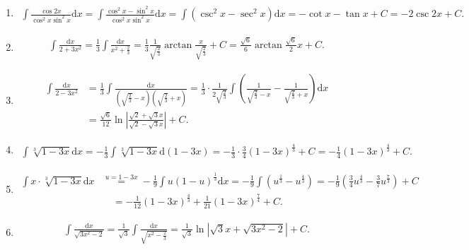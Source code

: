 \begin{solution}
\begin{enumerate}
    \item[8.]
    \[
    \begin{aligned}
    \int\frac{\cos{2x}}{\cos^2{x}\sin^2{x}}\mathrm{d}x=\int\frac{\cos^2{x}-\sin^2{x}}{\cos^2{x}\sin^2{x}}\mathrm{d}x=\int\left(\csc^2{x}-\sec^2{x}\right)\mathrm{d}x=-\cot{x}-\tan{x}+C=-2\csc{2x}+C.
    \end{aligned}
    \]

    \item[9.]
    \[
    \begin{aligned}
    \int\frac{\mathrm{d}x}{2+3x^2}=\frac{1}{3}\int\frac{\mathrm{d}x}{x^2+\frac{2}{3}}=\frac{1}{3}\frac{1}{\sqrt{\frac{2}{3}}}\arctan{\frac{x}{\sqrt{\frac{2}{3}}}}+C=\frac{\sqrt{6}}{6}\arctan{\frac{\sqrt{6}}{2}x}+C.
    \end{aligned}
    \]

    \item[10.]
    \[
    \begin{aligned}
    \int\frac{\mathrm{d}x}{2-3x^2}&=\frac{1}{3}\int\frac{\mathrm{d}x}{\left(\sqrt{\frac{2}{3}}-x\right)\left(\sqrt{\frac{2}{3}}+x\right)}=\frac{1}{3}\cdot\frac{1}{2\sqrt{\frac{2}{3}}}\int\left(\frac{1}{\sqrt{\frac{2}{3}}-x}-\frac{1}{\sqrt{\frac{2}{3}}+x}\right)\mathrm{d}x\\
    &=\frac{\sqrt{6}}{12}\ln\left|\frac{\sqrt{2}+\sqrt{3}x}{\sqrt{2}-\sqrt{3}x}\right|+C.
    \end{aligned}
    \]

    \item[11.]
    \[
    \begin{aligned}
    \int\sqrt[3]{1-3x}\mathrm{d}x=-\frac{1}{3}\int\sqrt[3]{1-3x}\mathrm{d}(1-3x)=-\frac{1}{3}\cdot\frac{3}{4}(1-3x)^{\frac{4}{3}}+C=-\frac{1}{4}(1-3x)^{\frac{4}{3}}+C.
    \end{aligned}
    \]

    \item[12.]
    \[
    \begin{aligned}
    \int x\cdot\sqrt[3]{1-3x}\mathrm{d}x&\overset{u=1-3x}{=}-\frac{1}{9}\int u(1-u)^{\frac{1}{3}}\mathrm{d}x=-\frac{1}{9}\int\left(u^{\frac{1}{3}}-u^{\frac{4}{3}}\right)=-\frac{1}{9}\left(\frac{3}{4}u^{\frac{4}{3}}-\frac{3}{7}u^{\frac{7}{3}}\right)+C\\
    &\quad=-\frac{1}{12}(1-3x)^{\frac{4}{3}}+\frac{1}{21}(1-3x)^{\frac{7}{4}}+C.
    \end{aligned}
    \]

    \item[13.]
    \[
    \begin{aligned}
    \int \frac{\mathrm{d}x}{\sqrt{3x^2-2}}=\frac{1}{\sqrt{3}}\int\frac{\mathrm{d}x}{\sqrt{x^2-\frac{2}{3}}}=\frac{1}{\sqrt{3}}\ln\left|\sqrt{3}x+\sqrt{3x^2-2}\right|+C.
    \end{aligned}
    \]


\end{enumerate}
\end{solution}
